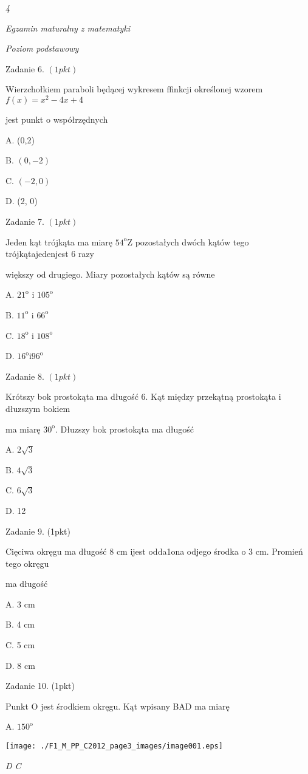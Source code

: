 \documentclass[a4paper,12pt]{article}
\begin{document}
{\it 4}

{\it Egzamin maturalny z matematyki}

{\it Poziom podstawowy}

Zadanie 6. $(1pkt)$

Wierzchołkiem paraboli będącej wykresem ffinkcji określonej wzorem $f(x)=x^{2}-4x+4$

jest punkt o współrzędnych

A. (0,2)

B. $(0,-2)$

C. $(-2,0)$

D. (2, 0)

Zadanie 7. $(1pkt)$

Jeden kąt trójkąta ma miarę $54^{\mathrm{o}} \mathrm{Z}$ pozostałych dwóch kątów tego trójkątajedenjest 6 razy

większy od drugiego. Miary pozostałych kątów są równe

A. $21^{\mathrm{o}}$ i $105^{\mathrm{o}}$

B. $11^{\mathrm{o}}$ i $66^{\mathrm{o}}$

C. $18^{\mathrm{o}}$ i $108^{\mathrm{o}}$

D. $16^{\mathrm{o}}\mathrm{i}96^{\mathrm{o}}$

Zadanie 8. $(1pkt)$

Krótszy bok prostokąta ma długość 6. Kąt między przekątną prostokąta i dłuzszym bokiem

ma miarę $30^{\mathrm{o}}$. Dłuzszy bok prostokąta ma długość

A. $2\sqrt{3}$

B. $4\sqrt{3}$

C. $6\sqrt{3}$

D. 12

Zadanie 9. (1pkt)

Cięciwa okręgu ma długość 8 cm ijest odda1ona odjego środka o 3 cm. Promień tego okręgu

ma długość

A. 3 cm

B. 4 cm

C. 5 cm

D. 8 cm

Zadanie 10. (1pkt)

Punkt O jest środkiem okręgu. Kąt wpisany BAD ma miarę

A. $150^{\mathrm{o}}$
\begin{center}
\texttt{[image: ./F1\_M\_PP\_C2012\_page3\_images/image001.eps]}
\end{center}
{\it D  C}
\end{document}
